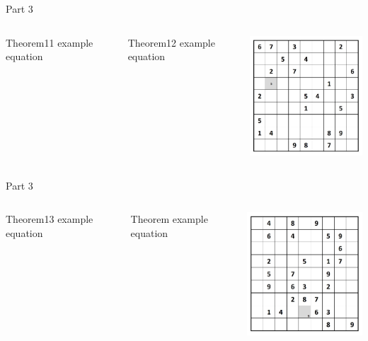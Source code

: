 \documentclass[xcolor=dvipsnames,table]{beamer}
\begin{document}

\begin{frame}{Part 3}
	\begin{columns}
	\begin{block}{Theorem11}{}
example equation
\end{block}
	\begin{block}{Theorem12}{}
example equation
\end{block}
		\includegraphics[width=5cm]{images/imagem21}
	\end{columns}
\end{frame}


\begin{frame}{Part 3}
	\begin{columns}
	\begin{block}{Theorem13}{}
example equation
\end{block}
	\begin{block}{Theorem}{}
example equation
\end{block}
		\column{.4 \textwidth}  		
		\includegraphics[width=5cm]{images/imagem22}
	\end{columns}
\end{frame}
\end{document}
